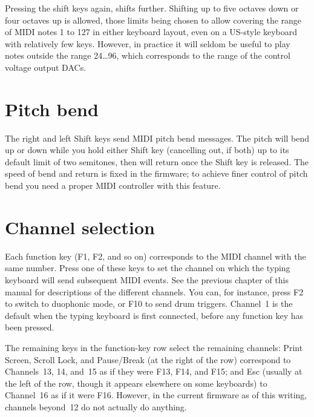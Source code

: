 Pressing the shift keys again, shifts further.  Shifting up to five octaves
down or four octaves up is allowed, those limits being chosen to allow
covering the range of MIDI notes 1 to 127 in either keyboard layout, even on
a US-style keyboard with relatively few keys.  However, in practice it will
seldom be useful to play notes outside the range 24\ldots 96, which
corresponds to the range of the control voltage output DACs.


\section{Pitch bend}

The right and left Shift keys send MIDI pitch bend messages.  The pitch will
bend up or down while you hold either Shift key (cancelling out, if both) up
to its default limit of two semitones, then will return once the Shift key
is released.  The speed of bend and return is fixed in the firmware; to
achieve finer control of pitch bend you need a proper MIDI controller
with this feature.


\section{Channel selection}

Each function key (F1, F2, and so on) corresponds to the MIDI channel with
the same number.  Press one of these keys to set the channel on which the
typing keyboard will send subsequent MIDI events.  See the previous chapter
of this manual for descriptions of the different channels.  You can, for
instance, press F2 to switch to duophonic mode, or F10 to send drum
triggers.  Channel~1 is the default when the typing keyboard is first
connected, before any function key has been pressed.

The remaining keys in the function-key row select the remaining channels:
Print Screen, Scroll Lock, and Pause/Break (at the right of the row)
correspond to Channels~13, 14, and~15 as if they were F13, F14, and F15; and
Esc (usually at the left of the row, though it appears elsewhere on some
keyboards) to Channel~16 as if it were F16.  However, in the current
firmware as of this writing, channels beyond~12 do not actually do
anything.

